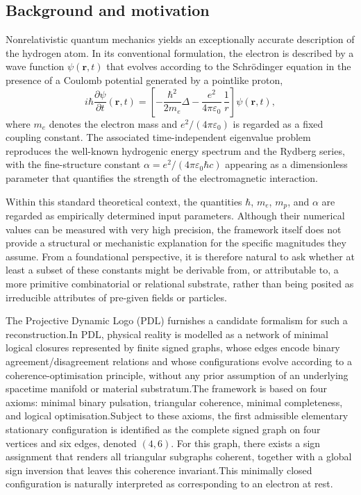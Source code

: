 \documentclass[12pt,a4paper]{article}
\begin{document}
\subsection{Background and motivation}

Nonrelativistic quantum mechanics yields an exceptionally accurate description of the hydrogen atom. In its conventional formulation, the electron is described by a wave function \(\psi(\mathbf{r},t)\) that evolves according to the Schrödinger equation in the presence of a Coulomb potential generated by a pointlike proton,
\[
  i\hbar \frac{\partial \psi}{\partial t}(\mathbf{r},t)
  =
  \left[
    -\frac{\hbar^2}{2m_e}\Delta
    - \frac{e^2}{4\pi\varepsilon_0}\,\frac{1}{r}
  \right]
  \psi(\mathbf{r},t),
\]
where \(m_e\) denotes the electron mass and \(e^2/(4\pi\varepsilon_0)\) is regarded as a fixed coupling constant. The associated time-independent eigenvalue problem reproduces the well-known hydrogenic energy spectrum and the Rydberg series, with the fine-structure constant \(\alpha = e^2/(4\pi\varepsilon_0 \hbar c)\) appearing as a dimensionless parameter that quantifies the strength of the electromagnetic interaction.

Within this standard theoretical context, the quantities \(\hbar\), \(m_e\), \(m_p\), and \(\alpha\) are regarded as empirically determined input parameters. Although their numerical values can be measured with very high precision, the framework itself does not provide a structural or mechanistic explanation for the specific magnitudes they assume. From a foundational perspective, it is therefore natural to ask whether at least a subset of these constants might be derivable from, or attributable to, a more primitive combinatorial or relational substrate, rather than being posited as irreducible attributes of pre-given fields or particles.

The Projective Dynamic Logo (PDL) furnishes a candidate formalism for such a reconstruction.\cite{Laubscher2026IntroPDL,Laubscher2026PDL_English,Laubscher2026LDP_French}In PDL, physical reality is modelled as a network of minimal logical closures represented by finite signed graphs, whose edges encode binary agreement/disagreement relations and whose configurations evolve according to a coherence-optimisation principle, without any prior assumption of an underlying spacetime manifold or material substratum.The framework is based on four axioms: minimal binary pulsation, triangular coherence, minimal completeness, and logical optimisation.Subject to these axioms, the first admissible elementary stationary configuration is identified as the complete signed graph on four vertices and six edges, denoted \((4,6)\). For this graph, there exists a sign assignment that renders all triangular subgraphs coherent, together with a global sign inversion that leaves this coherence invariant.This minimally closed configuration is naturally interpreted as corresponding to an electron at rest.
\end{document}
